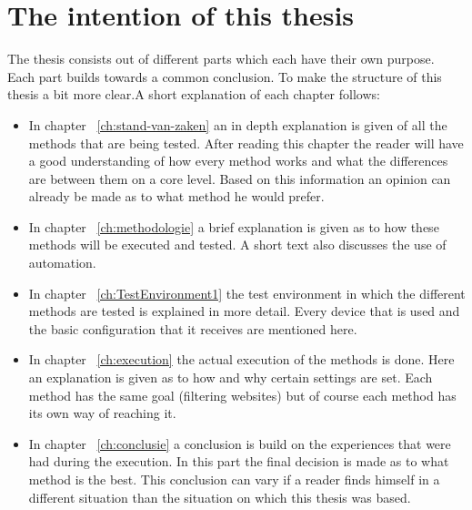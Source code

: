 \section{The intention of this thesis}
\label{sec:opzet-bachelorproef}
The thesis consists out of different parts which each have their own purpose. Each part builds towards a common conclusion. To make the structure of this thesis a bit more clear.A short explanation of each chapter follows:
\begin{itemize}
\item In chapter ~\ref{ch:stand-van-zaken} an in depth explanation is given of all the methods that are being tested. After reading this chapter the reader will have a good understanding of how every method works and what the differences are between them on a core level. Based on this information an opinion can already be made as to what method he would prefer.
\item In chapter ~\ref{ch:methodologie} a brief explanation is given as to how these methods will be executed and tested. A short text also discusses the use of automation.
\item In chapter ~\ref{ch:TestEnvironment1} the test environment in which the different methods are tested is explained in more detail. Every device that is used and the basic configuration that it receives are mentioned here.
\item In chapter ~\ref{ch:execution} the actual execution of the methods is done. Here an explanation is given as to how and why certain settings are set. Each method has the same goal (filtering websites) but of course each method has its own way of reaching it. 
\item In chapter ~\ref{ch:conclusie} a conclusion is build on the experiences that were had during the execution. In this part the final decision is made as to what method is the best. This conclusion can vary if a reader finds himself in a different situation than the situation on which this thesis was based.
\end{itemize}


